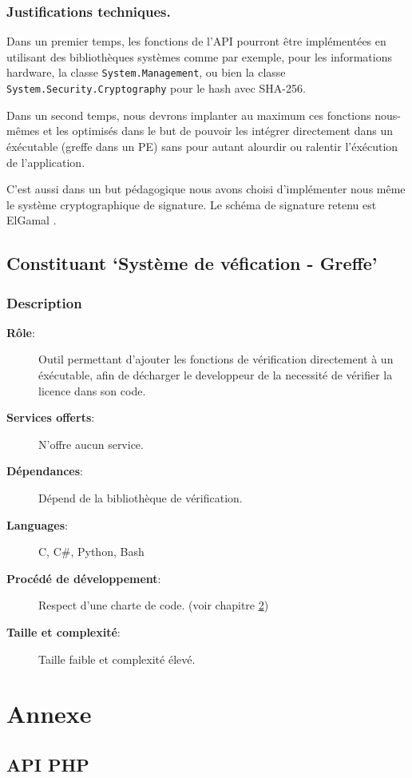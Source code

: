 \subsection{Justifications techniques.}
Dans un premier temps, les fonctions de l'API pourront être implémentées en utilisant des bibliothèques systèmes comme par exemple, pour les informations hardware,
la classe \verb:System.Management:, ou bien la classe \verb:System.Security.Cryptography: pour le hash avec SHA-256.\newline

Dans un second temps, nous devrons implanter au maximum ces fonctions nous-mêmes et 
les optimisés dans le but de pouvoir les intégrer directement dans un 
éxécutable (greffe dans un PE) sans pour autant alourdir ou ralentir l'éxécution de 
l'application. \newline

C'est aussi dans un but pédagogique nous avons choisi d'implémenter nous même le système cryptographique de signature. Le schéma de signature retenu est ElGamal \cite{ElGamal}.

\section{Constituant `Système de véfication - Greffe'}
\subsection{Description}
\begin{description}
	\item[\textbf{Rôle}:]
			Outil permettant d'ajouter les fonctions de vérification directement à un
			éxécutable, afin de décharger le developpeur de la necessité de vérifier
			la licence dans son code.
	\item[\textbf{Services offerts}:]
		N'offre aucun service.
	\item[\textbf{Dépendances}:]
		Dépend de la bibliothèque de vérification.
	\item[\textbf{Languages}:]
		C, C\#, Python, Bash 
	\item[\textbf{Procédé de développement}:]
		Respect d'une charte de code. (voir chapitre \ref{chap:Annexe}) 
	\item[\textbf{Taille et complexité}:]
		Taille faible et complexité élevé.
\end{description}


\chapter{Annexe}
\label{chap:Annexe}


\newpage

\section{API PHP}
\label{section:php}
\inputminted{php}{api.php}
